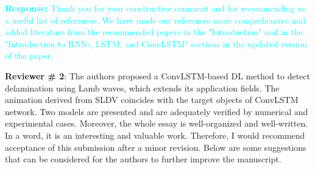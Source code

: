 \documentclass[11pt,a2paper]{report}
\begin{document}
\begin{enumerate}
\textcolor{Cyan}{
	\textbf{Response:}
	Thank you for your constructive comment and for recommending us a useful 
	list of references.
	We have made our references more comprehensive and added literature from 
	the recommended papers in the "Introduction" and in the 
	"Introduction to RNNs, LSTM, and ConvLSTM" sections in the updated version 
	of the paper.  
}	
\end{enumerate}	
	
\newpage 
\textbf{Reviewer \# 2}:
\newline The authors proposed a ConvLSTM-based DL method to detect delamination 
using Lamb waves, which extends its application fields.
The animation derived from SLDV coincides with the target objects of ConvLSTM 
network. 
Two models are presented and are adequately verified by numerical and 
experimental cases. 
Moreover, the whole essay is well-organized and well-written.
In a word, it is an interesting and valuable work. Therefore, I would recommend 
acceptance of this submission after a minor revision. Below are some 
suggestions that can be considered for the authors to further improve the 
manuscript.
\end{document}
